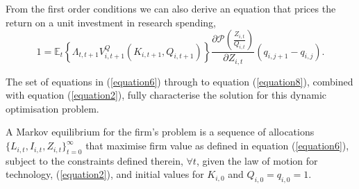 \documentclass{_latex/house}
\begin{document}
From the first order conditions we can also derive an equation that prices the return on a unit investment in research spending,
\begin{equation}
1=\mathbb{E}_{t}\left\{\Lambda_{t,t+1}V^{Q}_{i,t+1}(K_{i,t+1},Q_{i,t+1}) \right\} \frac{\partial  \mathcal{P}\left(\frac{Z_{i,t}}{Q_{i,t}} \right)   }{\partial  Z_{i,t}  }\left(q_{i,j+1}-q_{i,j}\right). \label{equation8}
\end{equation}

The set of equations in (\ref{equation6}) through to equation (\ref{equation8}), combined with equation (\ref{equation2}), fully characterise the solution for this dynamic optimisation problem.
\begin{definition}
A Markov equilibrium for the firm's problem is a sequence of allocations $\{L_{i,t}, I_{i,t}, Z_{i,t} \}_{t=0}^{\infty}$ that maximise firm value as defined in equation (\ref{equation6}), subject to the constraints defined therein, $\forall t$, given the law of motion for technology, (\ref{equation2}), and initial values for $K_{i,0}$ and $Q_{i,0}=q_{i,0}=1$.
\end{definition}
\end{document}

